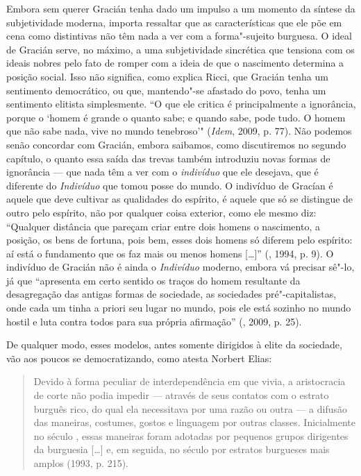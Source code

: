 Embora sem querer Gracián tenha dado um impulso a um momento da síntese
da subjetividade moderna, importa ressaltar que as características que
ele põe em cena como distintivas não têm nada a ver com a forma"-sujeito
burguesa. O ideal de Gracián serve, no máximo, a uma subjetividade
sincrética que tensiona com os ideais nobres pelo fato de romper com a
ideia de que o nascimento determina a posição social. Isso não
significa, como explica Ricci, que Gracián tenha um sentimento
democrático, ou que, mantendo"-se afastado do povo, tenha um sentimento
elitista simplesmente. ``O que ele critica é principalmente a
ignorância, porque o `homem é grande o quanto sabe; e quando sabe, pode
tudo. O homem que não sabe nada, vive no mundo tenebroso'"
(\emph{Idem}, 2009, p. 77). Não podemos senão concordar com Gracián,
embora saibamos, como discutiremos no segundo capítulo, o quanto essa
saída das trevas também introduziu novas formas de ignorância --- que
nada têm a ver com o \emph{indivíduo} que ele desejava, que é diferente
do \emph{Indivíduo} que tomou posse do mundo. O indivíduo de Gracían é
aquele que deve cultivar as qualidades do espírito, é aquele que só se
distingue de outro pelo espírito, não por qualquer coisa exterior, como
ele mesmo diz: ``Qualquer distância que pareçam criar entre dois homens
o nascimento, a posição, os bens de fortuna, pois bem, esses dois homens
só diferem pelo espírito: aí está o fundamento que os faz mais ou menos
homens [\ldots{}]'' (, 1994, p. 9). O indivíduo de Gracián não
é ainda o \emph{Indivíduo} moderno, embora vá precisar sê"-lo, já que
``apresenta em certo sentido os traços do homem resultante da
desagregação das antigas formas de sociedade, as sociedades
pré"-capitalistas, onde cada um tinha a priori seu lugar no mundo, pois
ele está sozinho no mundo hostil e luta contra todos para sua própria
afirmação'' (, 2009, p. 25).

De qualquer modo, esses modelos, antes somente dirigidos à elite da
sociedade, vão aos poucos se democratizando, como atesta Norbert Elias:

\begin{quote}
Devido à forma peculiar de interdependência em que vivia, a aristocracia
de corte não podia impedir --- através de seus contatos com o estrato
burguês rico, do qual ela necessitava por uma razão ou outra --- a
difusão das maneiras, costumes, gostos e linguagem por outras classes.
Inicialmente no século , essas maneiras foram adotadas por pequenos
grupos dirigentes da burguesia [\ldots{}] e, em seguida, no século
 por estratos burgueses mais amplos (1993, p. 215).
\end{quote}


